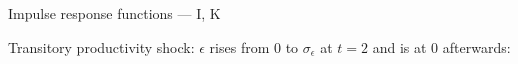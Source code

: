 \documentclass{beamer}
\begin{document}
\begin{frame}{Impulse response functions --- I, K}

  Transitory productivity shock: $\epsilon$ rises from 0 to $\sigma_\epsilon$ at $t=2$ and is at 0 afterwards:
\begin{center}
\vspace{-5mm}
\begin{figure}[h!]
\end{figure}
\end{center}

\end{frame}
\end{document}
